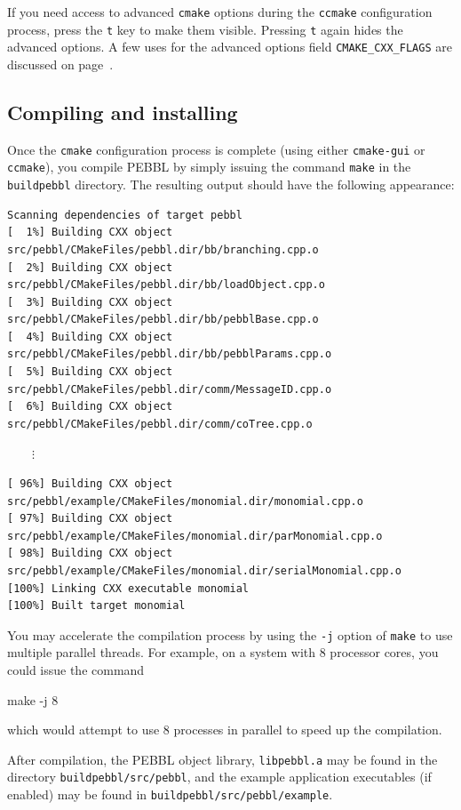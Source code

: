 If you need access to advanced \texttt{cmake} options during the
\texttt{ccmake} configuration process, press the \texttt{t} key to make them
visible.  Pressing \texttt{t} again hides the advanced options.  A few uses
for the advanced options field \texttt{CMAKE\_CXX\_FLAGS} are discussed on
page~\pageref{advancedoptions}.

\subsection{Compiling and installing}
Once the \texttt{cmake} configuration process is complete (using either
\texttt{cmake-gui} or \texttt{ccmake}), you compile PEBBL by simply issuing
the command \texttt{make} in the \texttt{buildpebbl} directory.  The resulting
output should have the following appearance:
{\footnotesize
\begin{verbatim}
Scanning dependencies of target pebbl
[  1%] Building CXX object src/pebbl/CMakeFiles/pebbl.dir/bb/branching.cpp.o
[  2%] Building CXX object src/pebbl/CMakeFiles/pebbl.dir/bb/loadObject.cpp.o
[  3%] Building CXX object src/pebbl/CMakeFiles/pebbl.dir/bb/pebblBase.cpp.o
[  4%] Building CXX object src/pebbl/CMakeFiles/pebbl.dir/bb/pebblParams.cpp.o
[  5%] Building CXX object src/pebbl/CMakeFiles/pebbl.dir/comm/MessageID.cpp.o
[  6%] Building CXX object src/pebbl/CMakeFiles/pebbl.dir/comm/coTree.cpp.o
\end{verbatim}
\vspace{-1.3ex}
$\qquad\vdots$
\begin{verbatim}
[ 96%] Building CXX object src/pebbl/example/CMakeFiles/monomial.dir/monomial.cpp.o
[ 97%] Building CXX object src/pebbl/example/CMakeFiles/monomial.dir/parMonomial.cpp.o
[ 98%] Building CXX object src/pebbl/example/CMakeFiles/monomial.dir/serialMonomial.cpp.o
[100%] Linking CXX executable monomial
[100%] Built target monomial
\end{verbatim}
}

You may accelerate the compilation process by using the \texttt{-j} option of
\texttt{make} to use multiple parallel threads.  For example, on a system with
8 processor cores, you could issue the command
\begin{codeblock}
make -j 8
\end{codeblock}
which would attempt to use 8 processes in parallel to speed up the compilation.

After compilation, the PEBBL object library, \texttt{libpebbl.a} may be found
in the directory \texttt{buildpebbl/src/pebbl}, and the example application
executables (if enabled) may be found in
\texttt{buildpebbl/src/pebbl/example}.

